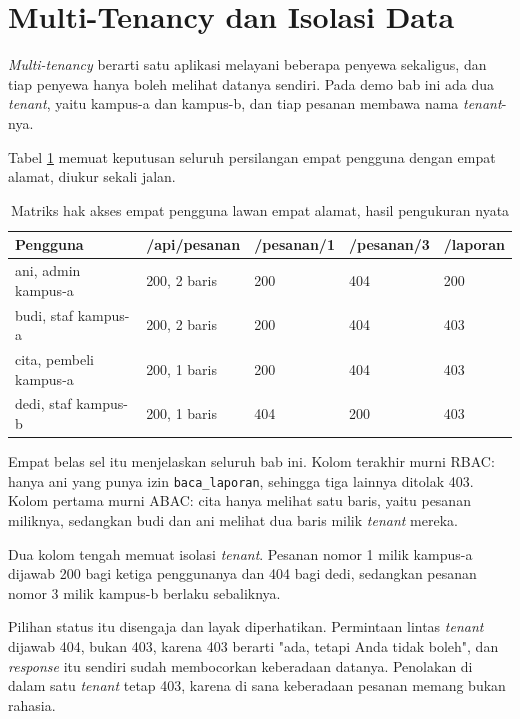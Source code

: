 \section{Multi-Tenancy dan Isolasi Data}

\textit{Multi-tenancy} berarti satu aplikasi melayani beberapa penyewa
sekaligus, dan tiap penyewa hanya boleh melihat datanya sendiri. Pada demo
bab ini ada dua \textit{tenant}, yaitu kampus-a dan kampus-b, dan tiap
pesanan membawa nama \textit{tenant}-nya.

Tabel \ref{tab:matriks} memuat keputusan seluruh persilangan empat pengguna
dengan empat alamat, diukur sekali jalan.

\begin{table}[!htb]
  \centering
  \caption{Matriks hak akses empat pengguna lawan empat alamat, hasil
           pengukuran nyata}
  \label{tab:matriks}
  \begin{tabularx}{\textwidth}{Xllll}
    \hline
    \textbf{Pengguna} & \textbf{/api/pesanan} & \textbf{/pesanan/1} & \textbf{/pesanan/3} & \textbf{/laporan} \\
    \hline
    ani, admin kampus-a & 200, 2 baris & 200 & 404 & 200 \\
    \hline
    budi, staf kampus-a & 200, 2 baris & 200 & 404 & 403 \\
    \hline
    cita, pembeli kampus-a & 200, 1 baris & 200 & 404 & 403 \\
    \hline
    dedi, staf kampus-b & 200, 1 baris & 404 & 200 & 403 \\
    \hline
  \end{tabularx}
\end{table}

Empat belas sel itu menjelaskan seluruh bab ini. Kolom terakhir murni RBAC:
hanya ani yang punya izin \texttt{baca\_laporan}, sehingga tiga lainnya
ditolak 403. Kolom pertama murni ABAC: cita hanya melihat satu baris, yaitu
pesanan miliknya, sedangkan budi dan ani melihat dua baris milik
\textit{tenant} mereka.

Dua kolom tengah memuat isolasi \textit{tenant}. Pesanan nomor 1 milik
kampus-a dijawab 200 bagi ketiga penggunanya dan 404 bagi dedi, sedangkan
pesanan nomor 3 milik kampus-b berlaku sebaliknya.

Pilihan status itu disengaja dan layak diperhatikan. Permintaan lintas
\textit{tenant} dijawab 404, bukan 403, karena 403 berarti "ada, tetapi Anda
tidak boleh", dan \textit{response} itu sendiri sudah membocorkan keberadaan datanya.
Penolakan di dalam satu \textit{tenant} tetap 403, karena di sana keberadaan
pesanan memang bukan rahasia.

